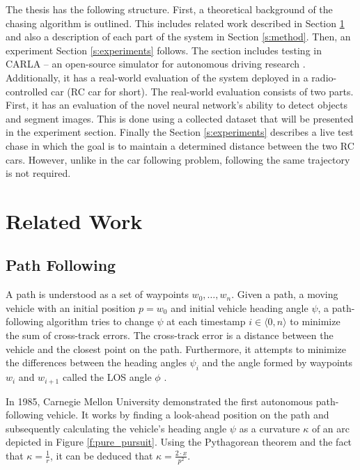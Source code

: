 \documentclass{ctuthesis/ctuthesis}
\begin{document}
The thesis has the following structure. First, a theoretical background of the chasing algorithm is outlined. This includes related work described in Section \ref{s:related_work} and also a description of each part of the system in Section \ref{s:method}. Then, an experiment Section \ref{s:experiments} follows. The section includes testing in CARLA -- an open-source simulator for autonomous driving research \cite{CARLA}. Additionally, it has a real-world evaluation of the system deployed in a radio-controlled car (RC car for short). The real-world evaluation consists of two parts. First, it has an evaluation of the novel neural network's ability to detect objects and segment images. This is done using a collected dataset that will be presented in the experiment section. Finally the Section \ref{s:experiments} describes a live test chase in which the goal is to maintain a determined distance between the two RC cars. However, unlike in the car following problem, following the same trajectory is not required.




\chapter{Related Work}\label{s:related_work}
\section{Path Following}
A path is understood as a set of waypoints $w_0,\dots ,w_n$. Given a path, a moving vehicle with an initial position $p=w_0$ and initial vehicle heading angle $\psi$, a path-following algorithm tries to change $\psi$ at each timestamp $i \in \langle 0,n\rangle$ to minimize the sum of cross-track errors. The cross-track error is a distance between the vehicle and the closest point on the path. Furthermore, it attempts to minimize the differences between the heading angles $\psi_i$ and the angle formed by waypoints $w_i$ and $w_{i+1}$ called the LOS angle $\phi$ \cite{path_following_evaluation}.\par

In 1985, Carnegie Mellon University \cite{pure_pursuit_orig} demonstrated the first autonomous path-following vehicle. It works by finding a look-ahead position on the path and subsequently calculating the vehicle's heading angle $\psi$ as a curvature $\kappa$ of an arc depicted in Figure \ref{f:pure_pursuit}. Using the Pythagorean theorem and the fact that $\kappa=\frac{1}{r}$, it can be deduced that $\kappa = \frac{2\cdot x}{p^2}$. \par
\end{document}

